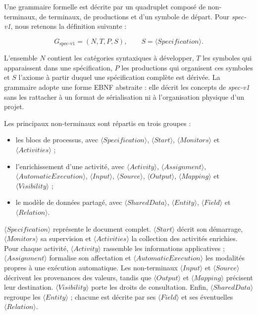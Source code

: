 Une grammaire formelle est décrite par un quadruplet composé de non-terminaux,
de terminaux, de productions et d'un symbole de départ. Pour \textit{spec-v1},
nous retenons la définition suivante :

\begin{equation}
G_{\text{spec-v1}}=(N,T,P,S),
\qquad S=\langle Specification\rangle.
\label{eq:chap3-modele-grammatical-specv1}
\end{equation}

L'ensemble $N$ contient les catégories syntaxiques à développer, $T$ les
symboles qui apparaissent dans une spécification, $P$ les productions qui
organisent ces symboles et $S$ l'axiome à partir duquel une spécification complète
est dérivée. La grammaire adopte une forme EBNF abstraite : elle décrit les
concepts de \textit{spec-v1} sans les rattacher à un format de sérialisation ni à
l'organisation physique d'un projet.

Les principaux non-terminaux sont répartis en trois groupes :

\begin{sloppypar}
\begin{itemize}
    \item les blocs de processus, avec $\langle Specification\rangle$,
    $\langle Start\rangle$, $\langle Monitors\rangle$ et
    $\langle Activities\rangle$ ;
    \item l'enrichissement d'une activité, avec $\langle Activity\rangle$,
    $\langle Assignment\rangle$, $\langle AutomaticExecution\rangle$,
    $\langle Input\rangle$, $\langle Source\rangle$,
    $\langle Output\rangle$, $\langle Mapping\rangle$ et
    $\langle Visibility\rangle$ ;
    \item le modèle de données partagé, avec $\langle SharedData\rangle$,
    $\langle Entity\rangle$, $\langle Field\rangle$ et
    $\langle Relation\rangle$.
\end{itemize}
\end{sloppypar}

$\langle Specification\rangle$ représente le document complet.
$\langle Start\rangle$ décrit son démarrage, $\langle Monitors\rangle$ sa
supervision et $\langle Activities\rangle$ la collection des activités enrichies.
Pour chaque activité, $\langle Activity\rangle$ rassemble les informations
applicatives ; $\langle Assignment\rangle$ formalise son affectation et
$\langle AutomaticExecution\rangle$ les modalités propres à une exécution
automatique. Les non-terminaux $\langle Input\rangle$ et $\langle Source\rangle$
décrivent les provenances des valeurs, tandis que $\langle Output\rangle$ et
$\langle Mapping\rangle$ précisent leur destination. $\langle Visibility\rangle$
porte les droits de consultation. Enfin, $\langle SharedData\rangle$ regroupe les
$\langle Entity\rangle$ ; chacune est décrite par ses $\langle Field\rangle$ et
ses éventuelles $\langle Relation\rangle$.

